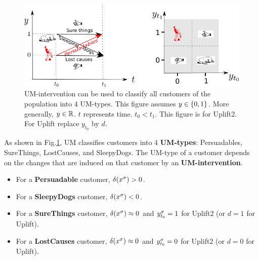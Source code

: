 \begin{figure}[h!]
\centering
\includegraphics[width=6in]
{uplift/uplift-y-t-up.png}
\caption{UM-intervention
can be used to classify
all customers of the
population into 4 UM-types.
This figure 
assumes $y\in \{0,1\}$.
More generally, $y\in { \mathbb{R}}$.
$t$ represents time. $t_0< t_1$.
This figure is for Uplift2. 
For Uplift replace $y_{t_0}$ by $d$.} 
\label{fig-uplift-y-t}
\end{figure}

As shown
in Fig.\ref{fig-uplift-y-t},
UM classifies customers
into 4 {\bf UM-types}: Persuadables, SureThings, LostCauses,
and SleepyDogs.
The UM-type
of a customer
depends on the changes 
that are induced on that customer
by an {\bf UM-intervention}.
\begin{itemize}
\item
For a {\bf Persuadable} customer,
$\delta(x^\sigma)>0$.
\item
For a {\bf SleepyDogs}
customer, $\delta(x^\sigma)< 0$.
\item
For a {\bf SureThings} customer,
 $\delta(x^\sigma)\approx 0$
and $y^\sigma_{t_0}=1$ for Uplift2
 (or $d=1$ for
Uplift).
\item
For a {\bf LostCauses} customer,
$\delta(x^\sigma)\approx 0$
and $y^\sigma_{t_0}=0$ for Uplift2
 (or $d=0$ for
Uplift).
\end{itemize}

